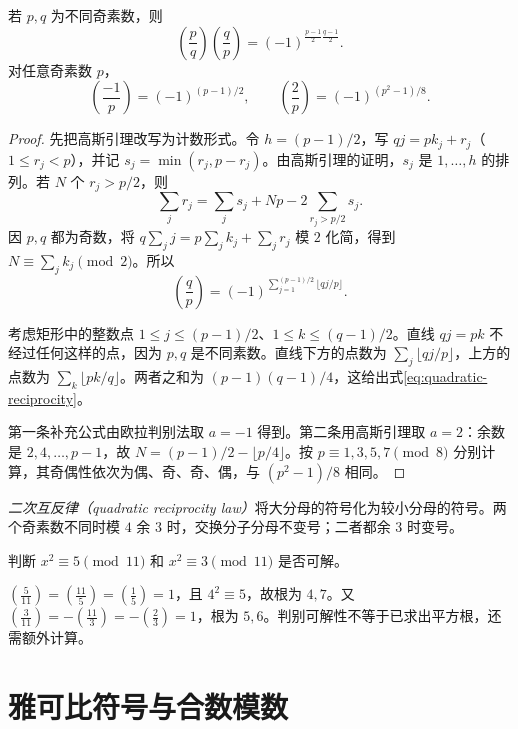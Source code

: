 \begin{theorem}[二次互反律]
\label{thm:quadratic-reciprocity}
若 $p,q$ 为不同奇素数，则
\begin{equation}
 \left(\frac pq\right)\left(\frac qp\right)
 =(-1)^{\frac{p-1}{2}\frac{q-1}{2}}.
 \label{eq:quadratic-reciprocity}
\end{equation}
对任意奇素数 $p$，
\begin{equation}
 \left(\frac{-1}{p}\right)=(-1)^{(p-1)/2},\qquad
 \left(\frac2p\right)=(-1)^{(p^2-1)/8}.
 \label{eq:quadratic-supplements}
\end{equation}
\end{theorem}
\begin{proof}
先把高斯引理改写为计数形式。令 $h=(p-1)/2$，写 $qj=pk_j+r_j$（$1\le r_j<p$），并记 $s_j=\min(r_j,p-r_j)$。由高斯引理的证明，$s_j$ 是 $1,\ldots,h$ 的排列。若 $N$ 个 $r_j>p/2$，则
\[
 \sum_jr_j=\sum_js_j+Np-2\sum_{r_j>p/2}s_j.
\]
因 $p,q$ 都为奇数，将 $q\sum_jj=p\sum_jk_j+\sum_jr_j$ 模 $2$ 化简，得到 $N\equiv\sum_jk_j\pmod2$。所以
\[
 \left(\frac qp\right)=(-1)^{\sum_{j=1}^{(p-1)/2}\lfloor qj/p\rfloor}.
\]

考虑矩形中的整数点 $1\le j\le(p-1)/2$、$1\le k\le(q-1)/2$。直线 $qj=pk$ 不经过任何这样的点，因为 $p,q$ 是不同素数。直线下方的点数为 $\sum_j\lfloor qj/p\rfloor$，上方的点数为 $\sum_k\lfloor pk/q\rfloor$。两者之和为 $(p-1)(q-1)/4$，这给出式\eqref{eq:quadratic-reciprocity}。

第一条补充公式由欧拉判别法取 $a=-1$ 得到。第二条用高斯引理取 $a=2$：余数是 $2,4,\ldots,p-1$，故 $N=(p-1)/2-\lfloor p/4\rfloor$。按 $p\equiv1,3,5,7\pmod8$ 分别计算，其奇偶性依次为偶、奇、奇、偶，与 $(p^2-1)/8$ 相同。
\end{proof}

\emph{二次互反律（quadratic reciprocity law）}将大分母的符号化为较小分母的符号。两个奇素数不同时模 $4$ 余 $3$ 时，交换分子分母不变号；二者都余 $3$ 时变号。

\begin{example}
判断 $x^2\equiv5\pmod{11}$ 和 $x^2\equiv3\pmod{11}$ 是否可解。
\end{example}
\begin{solve}
$\left(\frac5{11}\right)=\left(\frac{11}5\right)=\left(\frac15\right)=1$，且 $4^2\equiv5$，故根为 $4,7$。又 $\left(\frac3{11}\right)=-\left(\frac{11}3\right)=-\left(\frac23\right)=1$，根为 $5,6$。判别可解性不等于已求出平方根，还需额外计算。
\end{solve}

\section{雅可比符号与合数模数}


